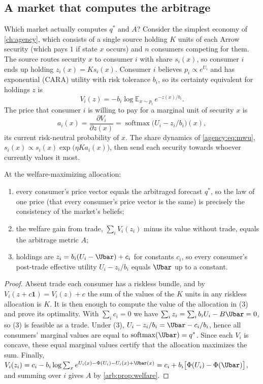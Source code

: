 \begin{draftblock}
\section{A market that computes the arbitrage}\label{arb:sec:cara}

Which market actually computes $q^*$ and $A$? Consider the simplest economy of \cref{ch:agency}, which consists of a single source holding $K$ units of each Arrow security (which pays $1$ if state $x$ occurs) and $n$ consumers competing for them. The source routes security $x$ to consumer $i$ with share $s_i(x)$, so consumer $i$ ends up holding $z_i(x)=Ks_i(x)$. Consumer $i$ believes $p_i\propto e^{U_i}$ and has exponential (CARA) utility with risk tolerance $b_i$, so its certainty equivalent for holdings $z$ is
\[
V_i(z)=-b_i\log\mathbb E_{x\sim p_i}\,e^{-z(x)/b_i}.
\]
The price that consumer $i$ is willing to pay for a marginal unit of security $x$ is
\[
a_i(x)=\frac{\partial V_i}{\partial z(x)}=\operatorname{softmax}\!\big(U_i-z_i/b_i\big)(x),
\]
its current risk-neutral probability of $x$. The share dynamics of \cref{agency:eq:mwu}, $s_i(x)\propto s_i(x)\exp\!\big(\eta Ka_i(x)\big)$, then send each security towards whoever currently values it most.

\begin{theorem}\label{arb:thm:cara}
At the welfare-maximizing allocation:
\begin{enumerate}
\item every consumer's price vector equals the arbitraged forecast $q^*$, so the law of one price (that every consumer's price vector is the same) is precisely the consistency of the market's beliefs;
\item the welfare gain from trade, $\sum_iV_i(z_i)$ minus its value without trade, equals the arbitrage metric $A$;
\item holdings are $z_i=b_i(U_i-\Ubar)+c_i$ for constants $c_i$, so every consumer's post-trade effective utility $U_i-z_i/b_i$ equals $\Ubar$ up to a constant.
\end{enumerate}
\end{theorem}

\begin{proof}
Absent trade each consumer has a riskless bundle, and by $V_i(z+c\mathbf1)=V_i(z)+c$ the sum of the values of the $K$ units in any riskless allocation is $K$. It is then enough to compute the value of the allocation in (3) and prove its optimality. With $\sum_ic_i=0$ we have $\sum_iz_i=\sum_ib_iU_i-B\Ubar=0$, so (3) is feasible as a trade. Under (3), $U_i-z_i/b_i=\Ubar-c_i/b_i$, hence all consumers' marginal values are equal to $\operatorname{softmax}(\Ubar)=q^*$. Since each $V_i$ is concave, these equal marginal values certify that the allocation maximizes the sum. Finally,
$V_i(z_i)=c_i-b_i\log\sum_xe^{U_i(x)-\Phi(U_i)-U_i(x)+\Ubar(x)}=c_i+b_i\big[\Phi(U_i)-\Phi(\Ubar)\big]$, and summing over $i$ gives $A$ by \cref{arb:prop:welfare}.
\end{proof}


\end{draftblock}
